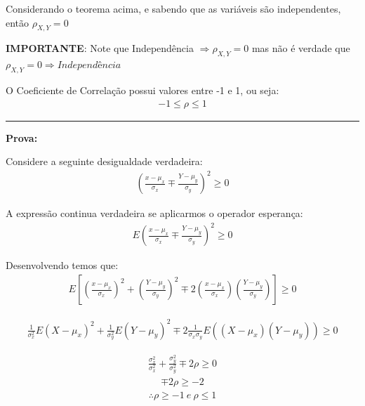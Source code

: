 \documentclass[
  letterpaper,
  DIV=11,
  numbers=noendperiod]{scrartcl}
\begin{document}
Considerando o teorema acima, e sabendo que as variáveis são
independentes, então \(\rho_{X,Y}=0\)

{\textbf{IMPORTANTE}}: Note que Independência
\(\Rightarrow \rho_{X,Y}=0\) mas não é verdade que
\(\rho_{X,Y}=0 \Rightarrow Independência\)

\begin{teorema}

O Coeficiente de Correlação possui valores entre -1 e 1, ou seja:
\[\begin{array}{ccc}
-1 \leq \rho \leq 1
\end{array}\]

\begin{center}\rule{0.5\linewidth}{0.5pt}\end{center}

\textbf{Prova:}

Considere a seguinte desigualdade verdadeira: \[\begin{array}{ccc}
(\frac{x-\mu_x}{\sigma_x}\mp \frac{Y-\mu_y}{\sigma_y} )^{2}\geq 0
\end{array}\]

A expressão continua verdadeira se aplicarmos o operador esperança:
\[\begin{array}{ccc}
E(\frac{x-\mu_x}{\sigma_x}\mp \frac{Y-\mu_y}{\sigma_y} )^{2}\geq 0
\end{array}\]

Desenvolvendo temos que: \[\begin{array}{ccc}
E[(\frac{x-\mu_x}{\sigma_x})^{2}+(\frac{Y-\mu_y}{\sigma_y})^{2} \mp 2 (\frac{x-\mu_x}{\sigma_x})(\frac{Y-\mu_y}{\sigma_y}) ]\geq 0
\end{array}\]

\[\begin{array}{ccc}
\frac{1}{\sigma_x^{2}}E({X-\mu_x})^{2}+\frac{1}{\sigma_y^{2}}E({Y-\mu_y})^{2}\mp 2 \frac{1}{\sigma_x \sigma_y}E((X-\mu_x)(Y-\mu_y) )\geq 0
\end{array}\]

\[\begin{array}{ccc}
\frac{\sigma_x^{2}}{\sigma_x^{2}}+\frac{\sigma_y^{2}}{\sigma_y^{2}}\mp 2\rho \geq 0
\end{array}\] \[\begin{array}{ccc}
\mp 2\rho \geq -2
\end{array}\] \[\begin{array}{ccc}
\therefore \rho \geq -1 \ e \ \rho \leq 1
\end{array}\]

\end{teorema}
\end{document}
